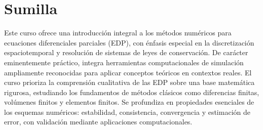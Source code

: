 \section{Sumilla}

Este curso ofrece una introducción integral a los métodos numéricos
para ecuaciones diferenciales parciales (EDP), con énfasis especial
en la discretización espaciotemporal y resolución de sistemas de
leyes de conservación.
De carácter eminentemente práctico, integra herramientas
computacionales de simulación ampliamente reconocidas para aplicar
conceptos teóricos en contextos reales.
El curso prioriza la comprensión cualitativa de las EDP sobre una
base matemática rigurosa, estudiando los fundamentos de métodos
clásicos como diferencias finitas, volúmenes finitos y elementos
finitos.
Se profundiza en propiedades esenciales de los esquemas numéricos:
estabilidad, consistencia, convergencia y estimación de error, con
validación mediante aplicaciones computacionales.

